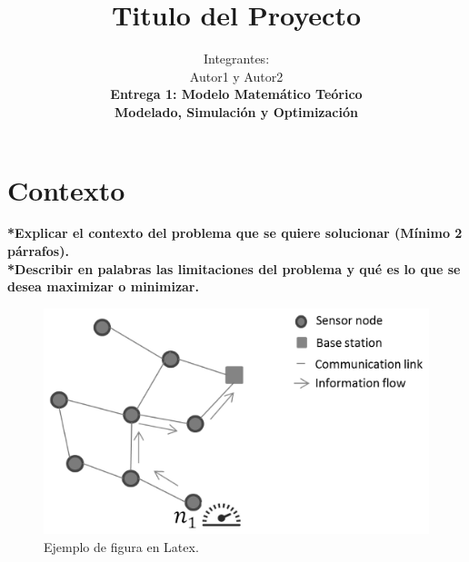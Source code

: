 \documentclass[runningheads]{llncs}
\begin{document}
%
\title{Titulo del Proyecto}
%
%
\author{Integrantes:\\ Autor1 y Autor2 \\
	\textbf{Entrega 1: Modelo Matem\'{a}tico Te\'{o}rico \\Modelado, Simulaci\'{o}n y Optimizaci\'{o}n} \\}
%
%
%
\maketitle              %
%
%
%
%
\section{Contexto}
\textbf{*Explicar el contexto del problema que se quiere solucionar (M\'{i}nimo 2 p\'{a}rrafos).}
\\
\textbf{*Describir en palabras las limitaciones del problema y qu\'{e} es lo que se desea maximizar o minimizar.}



\begin{figure}[h]
	\begin{center}
		\centerline{\includegraphics[scale=0.8]{./figures/network.eps}}
		\caption{Ejemplo de figura en Latex. \label{Fig:fig2}}
	\end{center}
\end{figure}
\end{document}

